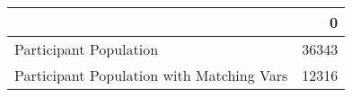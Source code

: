 \begin{tabular}{lr}
\toprule
{} &      0 \\
\midrule
Participant Population                    &  36343 \\
Participant Population with Matching Vars &  12316 \\
\bottomrule
\end{tabular}
